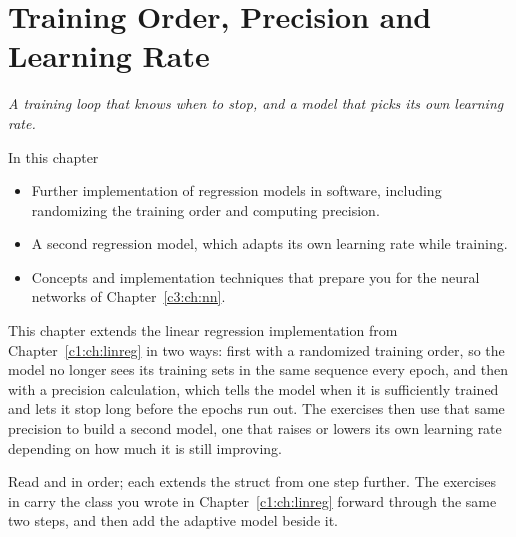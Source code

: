 
\chapter{Training Order, Precision and Learning Rate}
\label{c2:ch:training}

{\large\itshape A training loop that knows when to stop, and a model that picks its own learning
rate.\par}

\begin{chapterbox}{In this chapter}
\begin{itemize}
  \item Further implementation of regression models in software, including randomizing the
    training order and computing precision.
  \item A second regression model, which adapts its own learning rate while training.
  \item Concepts and implementation techniques that prepare you for the neural networks of
    Chapter~\ref{c3:ch:nn}.
\end{itemize}
\end{chapterbox}

This chapter extends the linear regression implementation from Chapter~\ref{c1:ch:linreg} in two
ways: first with a randomized training order, so the model no longer sees its training sets in the
same sequence every epoch, and then with a precision calculation, which tells the model when it is
sufficiently trained and lets it stop long before the epochs run out. The exercises then use that
same precision to build a second model, one that raises or lowers its own learning rate depending
on how much it is still improving.

Read  and  in order; each extends the struct from
 one step further. The exercises in  carry the class you
wrote in Chapter~\ref{c1:ch:linreg} forward through the same two steps, and then add the adaptive
model beside it.




